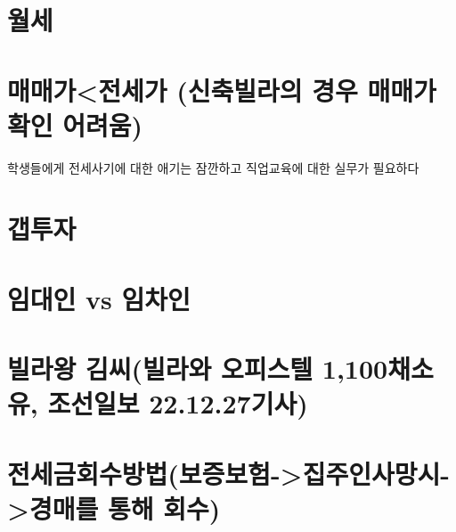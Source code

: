 \documentclass[
]{book}
\begin{document}
\hypertarget{uxc6d4uxc138}{%
\section{월세}\label{uxc6d4uxc138}}

\hypertarget{uxb9e4uxb9e4uxac00uxc804uxc138uxac00-uxc2e0uxcd95uxbe4cuxb77cuxc758-uxacbduxc6b0-uxb9e4uxb9e4uxac00-uxd655uxc778-uxc5b4uxb824uxc6c0}{%
\section{매매가\textless 전세가 (신축빌라의 경우 매매가 확인 어려움)}\label{uxb9e4uxb9e4uxac00uxc804uxc138uxac00-uxc2e0uxcd95uxbe4cuxb77cuxc758-uxacbduxc6b0-uxb9e4uxb9e4uxac00-uxd655uxc778-uxc5b4uxb824uxc6c0}}

학생들에게 전세사기에 대한 애기는 잠깐하고 직업교육에 대한 실무가 필요하다

\hypertarget{uxac2duxd22cuxc790}{%
\section{갭투자}\label{uxac2duxd22cuxc790}}

\hypertarget{uxc784uxb300uxc778-vs-uxc784uxcc28uxc778}{%
\section{임대인 vs 임차인}\label{uxc784uxb300uxc778-vs-uxc784uxcc28uxc778}}

\hypertarget{uxbe4cuxb77cuxc655-uxae40uxc528uxbe4cuxb77cuxc640-uxc624uxd53cuxc2a4uxd154-1100uxcc44uxc18cuxc720-uxc870uxc120uxc77cuxbcf4-22.12.27uxae30uxc0ac}{%
\section{빌라왕 김씨(빌라와 오피스텔 1,100채소유, 조선일보 22.12.27기사)}\label{uxbe4cuxb77cuxc655-uxae40uxc528uxbe4cuxb77cuxc640-uxc624uxd53cuxc2a4uxd154-1100uxcc44uxc18cuxc720-uxc870uxc120uxc77cuxbcf4-22.12.27uxae30uxc0ac}}

\hypertarget{uxc804uxc138uxae08uxd68cuxc218uxbc29uxbc95uxbcf4uxc99duxbcf4uxd5d8-uxc9d1uxc8fcuxc778uxc0acuxb9dduxc2dc-uxacbduxb9e4uxb97c-uxd1b5uxd574-uxd68cuxc218}{%
\section{전세금회수방법(보증보험-\textgreater 집주인사망시-\textgreater 경매를 통해 회수)}\label{uxc804uxc138uxae08uxd68cuxc218uxbc29uxbc95uxbcf4uxc99duxbcf4uxd5d8-uxc9d1uxc8fcuxc778uxc0acuxb9dduxc2dc-uxacbduxb9e4uxb97c-uxd1b5uxd574-uxd68cuxc218}}
\end{document}
